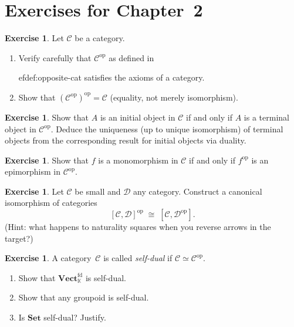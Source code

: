 \documentclass[a4paper,12pt]{book}
\newcommand{\Set}{\mathbf{Set}}
\newcommand{\Vect}{\mathbf{Vect}}
\newcommand{\op}{\mathrm{op}}
\newcommand{\K}{\mathbb{K}}
\theoremstyle{definition}
\newtheorem{exercise}[definition]{Exercise}
\theoremstyle{plain}
\theoremstyle{remark}
\begin{document}
\section{Exercises for Chapter~2}\label{sec:exercises-ch2}

\begin{exercise}\label{exo:op-op}
Let $\mathcal{C}$ be a category.
\begin{enumerate}[label=(\roman*)]
    \item Verify carefully that $\mathcal{C}^{\op}$ as defined in
          
ef{def:opposite-cat} satisfies the axioms of a category.
    \item Show that $(\mathcal{C}^{\op})^{\op}=\mathcal{C}$ (equality,
          not merely isomorphism).
\end{enumerate}
\end{exercise}

\begin{exercise}\label{exo:initial-terminal-dual}
Show that $A$ is an initial object in $\mathcal{C}$ if and only if
$A$ is a terminal object in $\mathcal{C}^{\op}$.
Deduce the uniqueness (up to unique isomorphism) of terminal objects
from the corresponding result for initial objects via duality.
\end{exercise}

\begin{exercise}\label{exo:mono-epi-dual}
Show that $f$ is a monomorphism in $\mathcal{C}$ if and only if
$f^{\op}$ is an epimorphism in $\mathcal{C}^{\op}$.
\end{exercise}

\begin{exercise}\label{exo:op-functor-category}
Let $\mathcal{C}$ be small and $\mathcal{D}$ any category.
Construct a canonical isomorphism of categories
\[
    [\mathcal{C},\mathcal{D}]^{\op}
    \;\cong\;
    [\mathcal{C},\mathcal{D}^{\op}].
\]
(Hint: what happens to naturality squares when you reverse arrows in the
target?)
\end{exercise}

\begin{exercise}\label{exo:self-dual-category}
A category~$\mathcal{C}$ is called \emph{self-dual} if
$\mathcal{C}\simeq\mathcal{C}^{\op}$.
\begin{enumerate}[label=(\roman*)]
    \item Show that $\Vect_\K^{\mathrm{fd}}$ is self-dual.
    \item Show that any groupoid is self-dual.
    \item Is $\Set$ self-dual?  Justify.
\end{enumerate}
\end{exercise}
\end{document}
